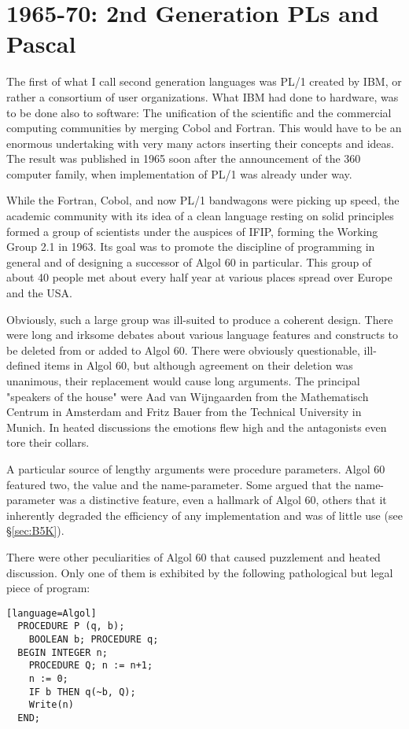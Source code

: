 \section{1965-70: 2nd Generation PLs and Pascal}
The first of what I call second generation languages was PL/1 created by IBM, or
rather a consortium of user organizations. What IBM had done to hardware, was to
be done also to software: The unification of the scientific and the commercial
computing communities by merging Cobol and Fortran. This would have to be an
enormous undertaking with very many actors inserting their concepts and ideas.
The result was published in 1965 soon after the announcement of the 360
computer family, when implementation of PL/1 was already under way.

While the Fortran, Cobol, and now PL/1 bandwagons were picking up speed, the
academic community with its idea of a clean language resting on solid principles
formed a group of scientists under the auspices of IFIP, forming the Working
Group 2.1 in 1963. Its goal was to promote the discipline of programming in
general and of designing a successor of Algol 60 in particular. This group of about
40 people met about every half year at various places spread over Europe and the
USA.

Obviously, such a large group was ill-suited to produce a coherent design. There
were long and irksome debates about various language features and constructs to
be deleted from or added to Algol 60. There were obviously questionable,
ill-defined items in Algol 60, but although agreement on their deletion was
unanimous, their replacement would cause long arguments. The principal
"speakers of the house" were Aad van Wijngaarden from the Mathematisch
Centrum in Amsterdam and Fritz Bauer from the Technical University in Munich. In
heated discussions the emotions flew high and the antagonists even tore their
collars.

A particular source of lengthy arguments were procedure parameters. Algol 60
featured two, the value and the name-parameter. Some argued that the
name-parameter was a distinctive feature, even a hallmark of Algol 60, others that
it inherently degraded the efficiency of any implementation and was of little use
(see \S\ref{sec:B5K}).

There were other peculiarities of Algol 60 that caused puzzlement and heated
discussion. Only one of them is exhibited by the following pathological but legal
piece of program:
\begin{verbatim}[language=Algol]
  PROCEDURE P (q, b);
    BOOLEAN b; PROCEDURE q;
  BEGIN INTEGER n;
    PROCEDURE Q; n := n+1;
    n := 0;
    IF b THEN q(~b, Q);
    Write(n)
  END;
\end{verbatim}

